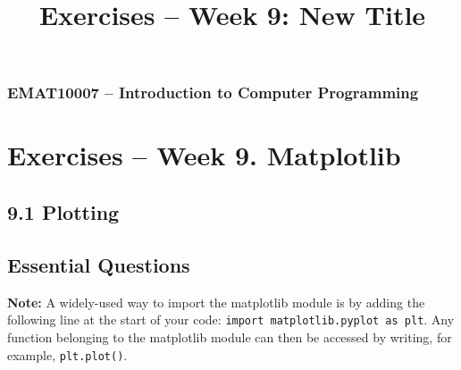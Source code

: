\documentclass[11pt]{report}
\begin{document}
\title{Exercises -- Week 9: New Title}
\subsubsection*{EMAT10007 -- Introduction to Computer Programming}
\section*{\Large Exercises -- Week 9. Matplotlib}

\subsection*{\Large 9.1 Plotting}
\subsection*{Essential Questions}

\textbf{Note:} A widely-used way to import the matplotlib module is by adding the following line at the start of your code: {\tt import matplotlib.pyplot as plt}. Any function belonging to the  matplotlib module can then be accessed by writing, for example, {\tt plt.plot()}.
\end{document}
